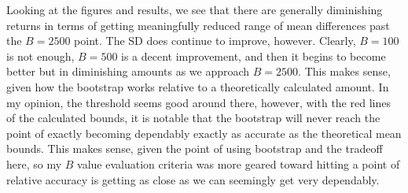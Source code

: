 \documentclass{article}
\begin{document}
{Looking at the figures and results, we see that there are generally diminishing returns in terms of getting meaningfully reduced range of mean differences past the \(B = 2500\) point. The SD does continue to improve, however. Clearly, \(B = 100\) is not enough, \(B = 500\) is a decent improvement, and then it begins to become better but in diminishing amounts as we approach \(B = 2500\). This makes sense, given how the bootstrap works relative to a theoretically calculated amount. In my opinion, the threshold seems good around there, however, with the red lines of the calculated bounds, it is notable that the bootstrap will never reach the point of exactly becoming dependably exactly as accurate as the theoretical mean bounds. This makes sense, given the point of using bootstrap and the tradeoff here, so my \(B\) value evaluation criteria was more geared toward hitting a point of relative accuracy is getting as close as we can seemingly get very dependably.


}
\end{document}
